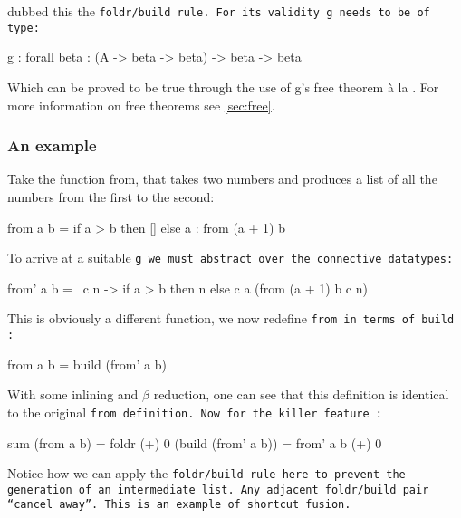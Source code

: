 \cite{Gill1993} dubbed this the \tt{foldr/build} rule. For its validity \tt{g} needs to be of type:
\begin{code}
    g : forall beta : (A -> beta -> beta) -> beta -> beta
\end{code}
Which can be proved to be true through the use of g's free theorem \`a la \cite{Wadler1989}. For more information on free theorems see \autoref{sec:free}.

\subsubsection{An example}
Take the function from, that takes two numbers and produces a list of all the numbers from the first to the second:
\begin{code}
    from a b = if a > b
               then []
               else a : from (a + 1) b
\end{code}
To arrive at a suitable \tt{g} we must abstract over the connective datatypes:
\begin{code}
    from' a b = \ c n  -> if a > b
                          then n
                          else c a (from (a + 1) b c n)
\end{code}
This is obviously a different function, we now redefine \tt{from} in terms of \tt{build} \citep{Gill1993}:
\begin{code}
    from a b = build (from' a b)
\end{code}
With some inlining and $\beta$ reduction, one can see that this definition is identical to the original \tt{from} definition. Now for the killer feature \citep{Gill1993}:
\begin{code}
    sum (from a b)
      = foldr (+) 0 (build (from' a b))
      = from' a b (+) 0
\end{code}
Notice how we can apply the \tt{foldr/build} rule here to prevent the generation of an intermediate list.
Any adjacent \tt{foldr/build} pair ``cancel away''.
This is an example of shortcut fusion.


